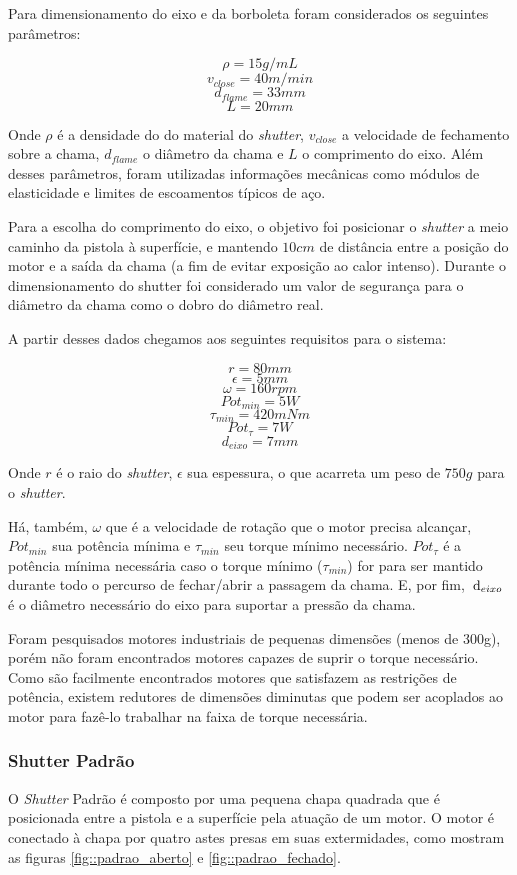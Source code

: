 Para dimensionamento do eixo e da borboleta foram considerados os seguintes
parâmetros:

\[\rho = 15 g/mL\]
\[v_{close} = 40 m/min\]
\[d_{flame} = 33mm\]
\[L = 20mm\]

Onde $\rho$ é a densidade do do material do \textit{shutter}, $v_{close}$ a
velocidade de fechamento sobre a chama, $d_{flame}$ o diâmetro da chama e $L$ o
comprimento do eixo. Além desses parâmetros, foram utilizadas informações
mecânicas como módulos de elasticidade e limites de escoamentos típicos de aço.

Para a escolha do comprimento do eixo, o objetivo foi posicionar o
\textit{shutter} a meio caminho da pistola à superfície, e mantendo $10cm$ de
distância entre a posição do motor e a saída da chama (a fim de evitar
exposição ao calor intenso). Durante o dimensionamento do shutter foi
considerado um valor de segurança para o diâmetro da chama como o dobro do
diâmetro real.

A partir desses dados chegamos aos seguintes requisitos para o sistema:

\[ r = 80 mm\]
\[ \epsilon = 5 mm\]
\[ \omega = 160 rpm\]
\[ {Pot}_{min} = 5 W \]
\[ \tau_{min} = 420 mNm \]
\[ Pot_{\tau} = 7 W \]
\[ d_{eixo} = 7 mm\]

Onde $r$ é o raio do \textit{shutter}, $\epsilon$ sua espessura, o que acarreta
um peso de $750g$ para o \textit{shutter}.

Há, também, $\omega$ que é a velocidade de rotação que o motor precisa alcançar,
$Pot_{min}$ sua potência mínima e $\tau_{min}$ seu torque mínimo necessário.
$Pot_{\tau}$ é a potência mínima necessária caso o torque mínimo ($\tau_{min}$)
for para ser mantido durante todo o percurso de fechar/abrir a passagem da
chama. E, por fim, $\,\mathrm{d}_{eixo}$ é o diâmetro necessário do eixo para suportar a
pressão da chama.

Foram pesquisados motores industriais de pequenas dimensões (menos de 300g),
porém não foram encontrados motores capazes de suprir o torque necessário. Como
são facilmente encontrados motores que satisfazem as restrições de potência,
existem redutores de dimensões diminutas que podem ser acoplados ao motor para
fazê-lo trabalhar na faixa de torque necessária.


\subsubsection{Shutter Padrão}

O \textit{Shutter} Padrão é composto por uma pequena chapa quadrada que é
posicionada entre a pistola e a superfície pela atuação de um motor. O motor é
conectado à chapa por quatro astes presas em suas extermidades, como mostram as
figuras \ref{fig::padrao_aberto} e \ref{fig::padrao_fechado}.

